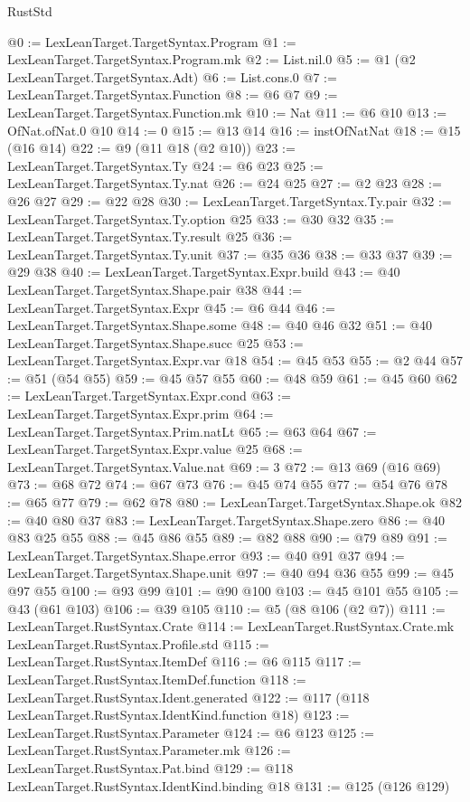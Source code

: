 \begin{lexlean}{RustStd}
\begin{coremodule}
{\begin{coremodule}
{{{{{@0 := LexLeanTarget.TargetSyntax.Program
@1 := LexLeanTarget.TargetSyntax.Program.mk
@2 := List.nil.{0}
@5 := @1 (@2 LexLeanTarget.TargetSyntax.Adt)
@6 := List.cons.{0}
@7 := LexLeanTarget.TargetSyntax.Function
@8 := @6 @7
@9 := LexLeanTarget.TargetSyntax.Function.mk
@10 := Nat
@11 := @6 @10
@13 := OfNat.ofNat.{0} @10
@14 := 0
@15 := @13 @14
@16 := instOfNatNat
@18 := @15 (@16 @14)
@22 := @9 (@11 @18 (@2 @10))
@23 := LexLeanTarget.TargetSyntax.Ty
@24 := @6 @23
@25 := LexLeanTarget.TargetSyntax.Ty.nat
@26 := @24 @25
@27 := @2 @23
@28 := @26 @27
@29 := @22 @28
@30 := LexLeanTarget.TargetSyntax.Ty.pair
@32 := LexLeanTarget.TargetSyntax.Ty.option @25
@33 := @30 @32
@35 := LexLeanTarget.TargetSyntax.Ty.result @25
@36 := LexLeanTarget.TargetSyntax.Ty.unit
@37 := @35 @36
@38 := @33 @37
@39 := @29 @38
@40 := LexLeanTarget.TargetSyntax.Expr.build
@43 := @40 LexLeanTarget.TargetSyntax.Shape.pair @38
@44 := LexLeanTarget.TargetSyntax.Expr
@45 := @6 @44
@46 := LexLeanTarget.TargetSyntax.Shape.some
@48 := @40 @46 @32
@51 := @40 LexLeanTarget.TargetSyntax.Shape.succ @25
@53 := LexLeanTarget.TargetSyntax.Expr.var @18
@54 := @45 @53
@55 := @2 @44
@57 := @51 (@54 @55)
@59 := @45 @57 @55
@60 := @48 @59
@61 := @45 @60
@62 := LexLeanTarget.TargetSyntax.Expr.cond
@63 := LexLeanTarget.TargetSyntax.Expr.prim
@64 := LexLeanTarget.TargetSyntax.Prim.natLt
@65 := @63 @64
@67 := LexLeanTarget.TargetSyntax.Expr.value @25
@68 := LexLeanTarget.TargetSyntax.Value.nat
@69 := 3
@72 := @13 @69 (@16 @69)
@73 := @68 @72
@74 := @67 @73
@76 := @45 @74 @55
@77 := @54 @76
@78 := @65 @77
@79 := @62 @78
@80 := LexLeanTarget.TargetSyntax.Shape.ok
@82 := @40 @80 @37
@83 := LexLeanTarget.TargetSyntax.Shape.zero
@86 := @40 @83 @25 @55
@88 := @45 @86 @55
@89 := @82 @88
@90 := @79 @89
@91 := LexLeanTarget.TargetSyntax.Shape.error
@93 := @40 @91 @37
@94 := LexLeanTarget.TargetSyntax.Shape.unit
@97 := @40 @94 @36 @55
@99 := @45 @97 @55
@100 := @93 @99
@101 := @90 @100
@103 := @45 @101 @55
@105 := @43 (@61 @103)
@106 := @39 @105
@110 := @5 (@8 @106 (@2 @7))
@111 := LexLeanTarget.RustSyntax.Crate
@114 := LexLeanTarget.RustSyntax.Crate.mk LexLeanTarget.RustSyntax.Profile.std
@115 := LexLeanTarget.RustSyntax.ItemDef
@116 := @6 @115
@117 := LexLeanTarget.RustSyntax.ItemDef.function
@118 := LexLeanTarget.RustSyntax.Ident.generated
@122 := @117 (@118 LexLeanTarget.RustSyntax.IdentKind.function @18)
@123 := LexLeanTarget.RustSyntax.Parameter
@124 := @6 @123
@125 := LexLeanTarget.RustSyntax.Parameter.mk
@126 := LexLeanTarget.RustSyntax.Pat.bind
@129 := @118 LexLeanTarget.RustSyntax.IdentKind.binding @18
@131 := @125 (@126 @129)
}}}}}
\end{coremodule}}
\end{coremodule}
\end{lexlean}
